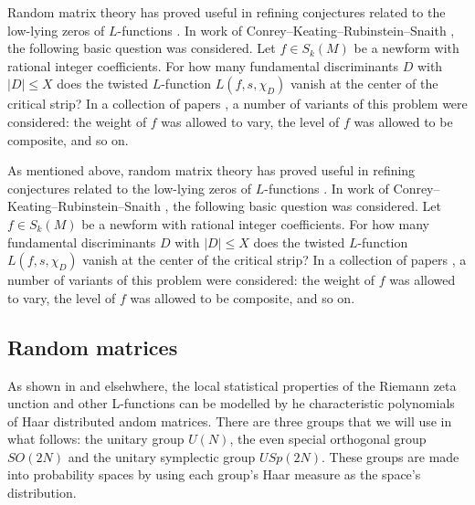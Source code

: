 \documentclass[11pt]{amsart}
\begin{document}
Random matrix theory has proved useful in refining conjectures related to the low-lying zeros of $L$-functions \cite{KeatingSnaith1,KeatingSnaith2}.  In work of Conrey--Keating--Rubinstein--Snaith \cite{CKRS}, the following basic question was considered.  Let $f \in S_k(M)$ be a newform with rational integer coefficients.  For how many fundamental discriminants $D$ with $|D|\leq X$ does the twisted $L$-function  $L (f,s,\chi_D)$ vanish at the center of the critical strip?  In a collection of papers \cite{MRVT,PT,TR}, a number of variants of this problem were considered: the weight of $f$ was allowed to vary, the level of $f$ was allowed to be composite, and so on.

As mentioned above, random matrix theory has proved useful in refining conjectures related to the low-lying zeros of $L$-functions \cite{KeatingSnaith1,KeatingSnaith2}.  In work of Conrey--Keating--Rubinstein--Snaith \cite{CKRS}, the following basic question was considered.  Let $f \in S_k(M)$ be a newform with rational integer coefficients.  For how many fundamental discriminants $D$ with $|D|\leq X$ does the twisted $L$-function  $L (f,s,\chi_D)$ vanish at the center of the critical strip?  In a collection of papers \cite{MRVT,PT,TR}, a number of variants of this problem were considered: the weight of $f$ was allowed to vary, the level of $f$ was allowed to be composite, and so on.

\subsection{Random matrices}

As shown in \cite{KeatingSnaith1,KeatingSnaith2,rubinstein,montgomery} and elsehwhere, the local statistical properties of the Riemann zeta unction and other L-functions can be modelled by he characteristic polynomials of Haar distributed andom matrices.  There are three groups that we will use in what follows:  the unitary group $U(N)$, the even special orthogonal group $SO(2N)$ and the unitary symplectic group $USp(2N)$.  These groups are made into probability spaces by using each group's Haar measure as the space's distribution.  
\end{document}
